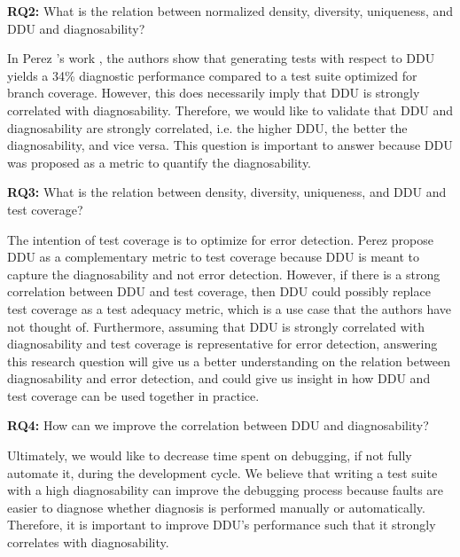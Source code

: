 \documentclass[twoside,a4paper,11pt]{memoir}
\begin{document}
\begin{framed}
\noindent
\textbf{RQ2:} What is the relation between normalized density, diversity, uniqueness, and DDU and diagnosability?
\end{framed}
In Perez \etal's work \cite{DBLP:conf/icse/PerezAD17}, the authors show that generating tests with respect to DDU yields a 34\% diagnostic performance compared to a test suite optimized for branch coverage.
However, this does necessarily imply that DDU is strongly correlated with diagnosability.
Therefore, we would like to validate that DDU and diagnosability are strongly correlated, i.e. the higher DDU, the better the diagnosability, and vice versa.
This question is important to answer because DDU was proposed as a metric to quantify the diagnosability.

\begin{framed}
\noindent
\textbf{RQ3:} What is the relation between density, diversity, uniqueness, and DDU and test coverage?
\end{framed}
The intention of test coverage is to optimize for error detection.
Perez \etal \cite{DBLP:conf/icse/PerezAD17} propose DDU as a complementary metric to test coverage because DDU is meant to capture the diagnosability and not error detection.
However, if there is a strong correlation between DDU and test coverage, then DDU could possibly replace test coverage as a test adequacy metric, which is a use case that the authors have not thought of.
Furthermore, assuming that DDU is strongly correlated with diagnosability and test coverage is representative for error detection, answering this research question will give us a better understanding on the relation between diagnosability and error detection, and could give us insight in how DDU and test coverage can be used together in practice.

\begin{framed}
\noindent
\textbf{RQ4:} How can we improve the correlation between DDU and diagnosability?
\end{framed}
Ultimately, we would like to decrease time spent on debugging, if not fully automate it, during the development cycle.
We believe that writing a test suite with a high diagnosability can improve the debugging process because faults are easier to diagnose whether diagnosis is performed manually or automatically.
Therefore, it is important to improve DDU's performance such that it strongly correlates with diagnosability.
\end{document}
